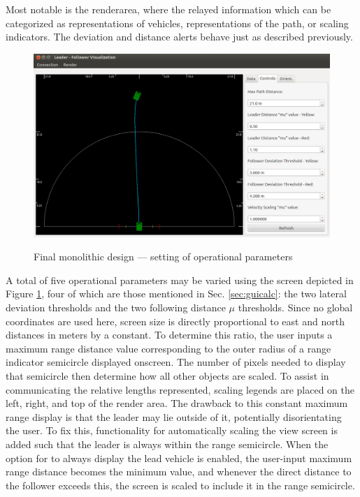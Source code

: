 \documentclass[12pt]{report}
\begin{document}
Most notable is the renderarea, where the relayed information which can be categorized as representations of vehicles, representations of the path, or scaling indicators.
The deviation and distance alerts behave just as described previously.

\begin{figure}[ht] \centering \label{fig:finaldesopts}
    \includegraphics[width=5in]{./figs/final_design_opts.png}
    \caption{Final monolithic design --- setting of operational parameters }
\end{figure}

A total of five operational parameters may be varied using the screen depicted in Figure \ref{fig:finaldesopts}, four of which are those mentioned in Sec. \ref{sec:guicalc}: the two lateral deviation thresholds and the two following distance $\mu$ thresholds. Since no global coordinates are used here, screen size is directly proportional to east and north distances in meters by a constant. To determine this ratio, the user inputs a maximum range distance value corresponding to the outer radius of a range indicator semicircle displayed onscreen. The number of pixels needed to display that semicircle then determine how all other objects are scaled. To assist in communicating the relative lengths represented, scaling legends are placed on the left, right, and top of the render area. The drawback to this constant maximum range display is that the leader may lie outside of it, potentially disorientating the user. To fix this, functionality for automatically scaling the view screen is added such that the leader is always within the range semicircle. When the option for to always display the lead vehicle is enabled, the user-input maximum range distance becomes the minimum value, and whenever the direct distance to the follower exceeds this, the screen is scaled to include it in the range semicircle.
\end{document}
